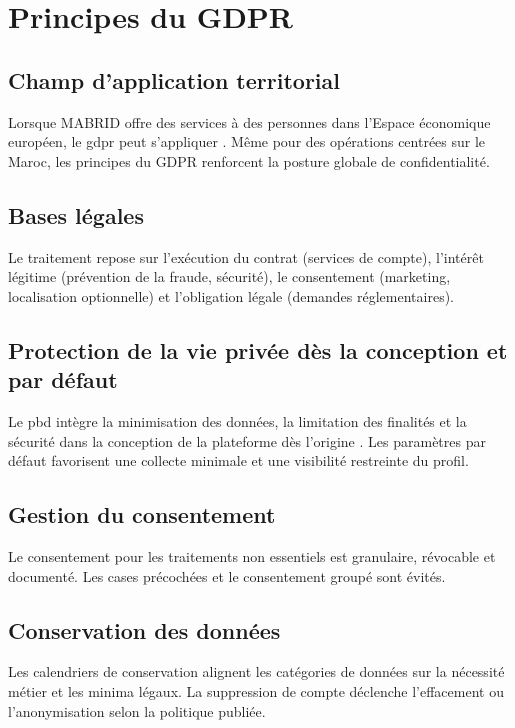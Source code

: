 \section{Principes du GDPR}

\subsection{Champ d'application territorial}

Lorsque MABRID offre des services à des personnes dans l'Espace économique européen, le \gls{gdpr} peut s'appliquer \parencite{euGDPR}. Même pour des opérations centrées sur le Maroc, les principes du GDPR renforcent la posture globale de confidentialité.

\subsection{Bases légales}

Le traitement repose sur l'exécution du contrat (services de compte), l'intérêt légitime (prévention de la fraude, sécurité), le consentement (marketing, localisation optionnelle) et l'obligation légale (demandes réglementaires).

\subsection{Protection de la vie privée dès la conception et par défaut}

Le \gls{pbd} intègre la minimisation des données, la limitation des finalités et la sécurité dans la conception de la plateforme dès l'origine \parencite{cavoukian2009pbd}. Les paramètres par défaut favorisent une collecte minimale et une visibilité restreinte du profil.

\subsection{Gestion du consentement}

Le consentement pour les traitements non essentiels est granulaire, révocable et documenté. Les cases précochées et le consentement groupé sont évités.

\subsection{Conservation des données}

Les calendriers de conservation alignent les catégories de données sur la nécessité métier et les minima légaux. La suppression de compte déclenche l'effacement ou l'anonymisation selon la politique publiée.

